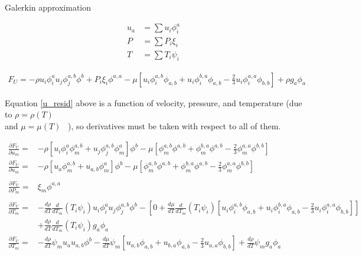 \documentclass[10pt]{article}
\begin{document}
Galerkin approximation

\begin{align*}
    u_a &= \sum u_i \phi_i^a\\
    P &= \sum P_i \xi_i\\
    T &= \sum T_i \psi_i
\end{align*}

\begin{align}
    F_U =  -\rho u_i \phi_i^a u_j \phi_j^{a,b} \phi^b + P_i \xi_i \phi^{a,a} - \mu \left [u_i \phi_i^{a,b} \phi_{a,b} + u_i \phi_i^{b,a} \phi_{a,b} - \frac{2}{3} u_i \phi_i^{a,a} \phi_{b,b} \right ] + \rho g_a \phi_a \label{u_resid}
\end{align}

Equation \ref{u_resid} above is a function of velocity, pressure, and temperature (due to $\rho = \rho(T)$ \\and $\mu = \mu(T)$ \ ), so derivatives must be taken with respect to all of them.

\begin{align}
   \frac{\partial F_U}{\partial u_m} = &-\rho \left [ u_i \phi_i^a \phi_m^{a,b} + u_j \phi_j^{a,b} \phi_m^a \right ] \phi^b 
        - \mu \left [\phi_m^{a,b} \phi^{a,b} + \phi_m^{b,a} \phi^{a,b} - \frac{2}{3} \phi_m^{a,a} \phi^{b,b} \right ] \nonumber \\     
   \frac{\partial F_U}{\partial u_m} = &-\rho \left [ u_a \phi_m^{a,b} + u_{a,b} \phi_m^a \right ] \phi^b - \mu \left [\phi_m^{a,b} \phi^{a,b} + \phi_m^{b,a} \phi^{a,b} - \frac{2}{3} \phi_m^{a,a} \phi^{b,b} \right ] \label{du_du}\\
   \nonumber \\ 
   \frac{\partial F_U}{\partial P_m} = &\xi_m \phi^{a,a} \label{du_dp} \\
   \nonumber \\
   \frac{\partial F_U}{\partial T_m} = &-\frac{d\rho}{dT} \frac{d}{dT_m}(T_i \psi_i) u_i \phi_i^a u_j \phi_j^{a,b} \phi^b
        - \left[ 0 + \frac{d\mu}{dT} \frac{d}{dT_m}(T_i \psi_i) [u_i \phi_i^{a,b} \phi_{a,b} + u_i \phi_i^{b,a} \phi_{a,b} - \frac{2}{3} u_i \phi_i^{a,a} \phi_{b,b} ] \right ] \nonumber
        \\ &+ \frac{d\rho}{dT} \frac{d}{dT_m}(T_i \psi_i) g_a \phi_a \nonumber \\       
   \frac{\partial F_U}{\partial T_m} = &-\frac{d\rho}{dT} \psi_m u_a u_{a,b} \phi^b
        - \frac{d\mu}{dT} \psi_m \left [u_{a,b} \phi_{a,b} + u_{b,a} \phi_{a,b} - \frac{2}{3} u_{a,a} \phi_{b,b} \right ]
        + \frac{d\rho}{dT} \psi_m g_a \phi_a \label{du_dT} 
\end{align}
\end{document}
